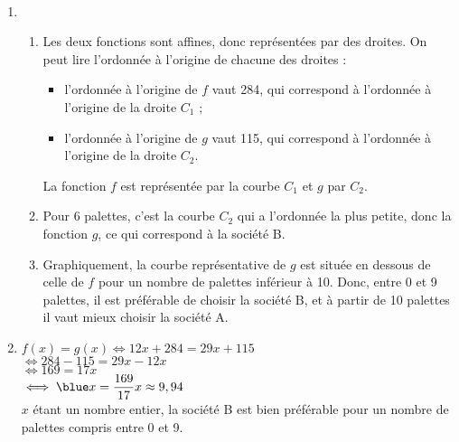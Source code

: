\ \\ [-5mm]
   \begin{enumerate}
      \item
         \begin{enumerate}
            \item Les deux fonctions sont affines, donc représentées par des droites. On peut lire l'ordonnée à l'origine de chacune des droites :
               \begin{itemize}
                  \item l'ordonnée à l'origine de $f$ vaut 284, qui correspond à l'ordonnée à l'origine de la droite $C_1$ ;
                  \item l'ordonnée à l'origine de $g$ vaut 115, qui correspond à l'ordonnée à l'origine de la droite $C_2$.
               \end{itemize}
               {\blue La fonction $f$ est représentée par la courbe $C_1$ et $g$ par $C_2$}.
            \item Pour 6 palettes, c'est la courbe $C_2$ qui a l'ordonnée la plus petite, donc la fonction $g$, ce qui correspond à {\blue la société B}.
            \item Graphiquement, la courbe représentative de $g$ est située en dessous de celle de $f$ pour un nombre de palettes inférieur à 10. Donc, {\blue entre 0 et 9 palettes, il est préférable de choisir la société B, et à partir de 10 palettes il vaut mieux choisir la société A}.
         \end{enumerate}
      \setcounter{enumi}{1}
      \item $f(x) =g(x) \iff 12x+284 =29x+115$ \\
         \hspace*{2.13cm} $\iff 284-115 =29x-12x$ \\
         \hspace*{2.13cm} $\iff 169 =17x$ \\ [1mm]
         \hspace*{2.13cm} $\iff {\blue x =\dfrac{169}{17}} x \approx9,94$ \\ [1mm]
         $x$ étant un nombre entier, {\blue la société B est bien préférable pour un nombre de palettes compris entre 0 et 9}.
      \end{enumerate}
